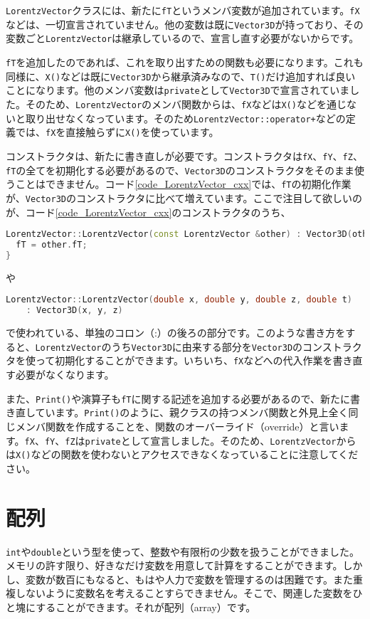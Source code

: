 \texttt{LorentzVector}クラスには、新たに\texttt{fT}というメンバ変数が追加されています。\texttt{fX}などは、一切宣言されていません。他の変数は既に\texttt{Vector3D}が持っており、その変数ごと\texttt{LorentzVector}は継承しているので、宣言し直す必要がないからです。

\texttt{fT}を追加したのであれば、これを取り出すための関数も必要になります。これも同様に、\texttt{X()}などは既に\texttt{Vector3D}から継承済みなので、\texttt{T()}だけ追加すれば良いことになります。他のメンバ変数は\texttt{private}として\texttt{Vector3D}で宣言されていました。そのため、\texttt{LorentzVector}のメンバ関数からは、\texttt{fX}などは\texttt{X()}などを通じないと取り出せなくなっています。そのため\texttt{LorentzVector::operator+}などの定義では、\texttt{fX}を直接触らずに\texttt{X()}を使っています。

コンストラクタは、新たに書き直しが必要です。コンストラクタは\texttt{fX}、\texttt{fY}、\texttt{fZ}、\texttt{fT}の全てを初期化する必要があるので、\texttt{Vector3D}のコンストラクタをそのまま使うことはできません。コード\ref{code_LorentzVector_cxx}では、\texttt{fT}の初期化作業が、\texttt{Vector3D}のコンストラクタに比べて増えています。ここで注目して欲しいのが、コード\ref{code_LorentzVector_cxx}のコンストラクタのうち、
\begin{lstlisting}[language=c++]
LorentzVector::LorentzVector(const LorentzVector &other) : Vector3D(other) {
  fT = other.fT;
}
\end{lstlisting}
や
\begin{lstlisting}[language=c++]
LorentzVector::LorentzVector(double x, double y, double z, double t)
    : Vector3D(x, y, z)
\end{lstlisting}
で使われている、単独のコロン（:）の後ろの部分です。このような書き方をすると、\texttt{LorentzVector}のうち\texttt{Vector3D}に由来する部分を\texttt{Vector3D}のコンストラクタを使って初期化することができます。いちいち、\texttt{fX}などへの代入作業を書き直す必要がなくなります。

また、\texttt{Print()}や演算子も\texttt{fT}に関する記述を追加する必要があるので、新たに書き直しています。\texttt{Print()}のように、親クラスの持つメンバ関数と外見上全く同じメンバ関数を作成することを、関数のオーバーライド（override）と言います。\texttt{fX}、\texttt{fY}、\texttt{fZ}は\texttt{private}として宣言しました。そのため、\texttt{LorentzVector}からは\texttt{X()}などの関数を使わないとアクセスできなくなっていることに注意してください。

\section{配列}
\label{sec:配列}
\texttt{int}や\texttt{double}という型を使って、整数や有限桁の少数を扱うことができました。メモリの許す限り、好きなだけ変数を用意して計算をすることができます。しかし、変数が数百にもなると、もはや人力で変数を管理するのは困難です。また重複しないように変数名を考えることすらできません。そこで、関連した変数をひと塊にすることができます。それが配列（array）です。

